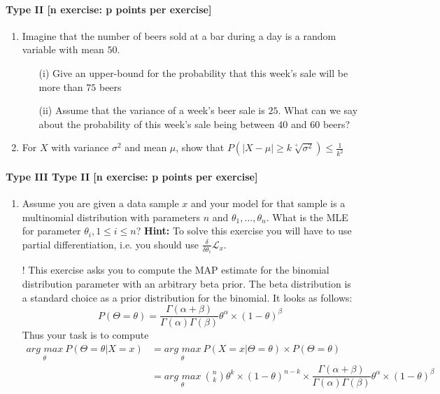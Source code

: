 \documentclass{article}
\begin{document}
\paragraph{Type II [n exercise: p points per exercise]}
\begin{enumerate}
	\item Imagine that the number of beers sold at a bar during a day is a random variable with mean $50$.
		\begin{itemize}
			\item[(i)] Give an upper-bound for the probability that this week's sale will be more than $75$ beers
			\item[(ii)] Assume that the variance of a week's beer sale is $25$. What can we say about the probability of this week's sale being between $40$ and $60$ beers?
		\end{itemize}
	\item For $X$ with variance $\sigma^2$ and mean $\mu$, show that $P(|X-\mu| \geq k\sqrt[+]{\sigma^2}) \leq \frac{1}{k^2}$
\end{enumerate}

\paragraph{Type III Type II [n exercise: p points per exercise]}
\begin{enumerate}
	\item Assume you are given a data sample $ x $ and your model for that sample is a multinomial distribution with parameters $ n $ and 
	$ \theta_{1}, \ldots, \theta_{n} $. What is the MLE for parameter $ \theta_{i}, 1 \leq i \leq n $? \textbf{Hint:} To solve this exercise you will
	have to use partial differentiation, i.e. you should use $ \frac{\delta}{\delta\theta_{i}}\mathcal{L}_{x} $.
	\item[\arabic{enumi}!] This exercise asks you to compute the MAP estimate for the binomial distribution parameter with an arbitrary beta prior. The beta distribution
	is a standard choice as a prior distribution for the binomial. It looks as follows:
	\begin{equation*}
	P(\Theta=\theta) = \dfrac{\Gamma(\alpha + \beta)}{\Gamma(\alpha)\Gamma(\beta)}\theta^{\alpha} \times (1-\theta)^{\beta}
	\end{equation*}
	Thus your task is to compute
	\begin{align*}
	\underset{\theta}{arg\, \, max}~P(\Theta=\theta|X=x) &= \underset{\theta}{arg\, \, max}~P(X =x |\Theta = \theta) \times P(\Theta = \theta) \\
	&= \underset{\theta}{arg\, \, max}~\binom{n}{k}\theta^{k}\times (1-\theta)^{n-k} \times \dfrac{\Gamma(\alpha + \beta)}{\Gamma(\alpha)\Gamma(\beta)}\theta^{\alpha} \times (1-\theta)^{\beta}
	\end{align*}
\end{enumerate}
\end{document}
